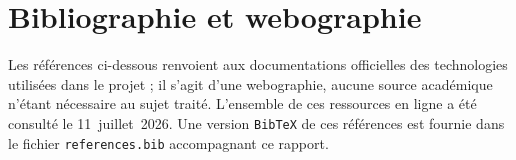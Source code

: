 \chapter*{Bibliographie et webographie}

Les références ci-dessous renvoient aux documentations officielles des
technologies utilisées dans le projet ; il s'agit d'une webographie, aucune
source académique n'étant nécessaire au sujet traité. L'ensemble de ces
ressources en ligne a été consulté le 11~juillet~2026. Une version
\texttt{BibTeX} de ces références est fournie dans le fichier
\texttt{references.bib} accompagnant ce rapport.

